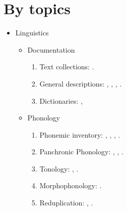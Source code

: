 \documentclass[oneside,a4paper,11pt]{article}
\newcommand{\langue}[2]{#1}
\begin{document}
\section{\langue{By topics}{Publications classées par domaine de recherche}}
\begin{itemize}
\item  \langue{Linguistics}{Linguistique} 
\begin{itemize}
\item  Documentation
\begin{enumerate}
\item  \langue{Text collections}{Collections de textes}: \citet{jacques10gesar}.
\item \langue{General descriptions}{Descriptions générales}: \citet{jacques04these}, \citet{jacques08}, \citet{jacques17sketch}, \citet{jacques17stau}.
\item \langue{Dictionaries}{Dictionnaires}: \citet{jacques15japhug}, \citet{jacques15khaling}
\end{enumerate}


\item \langue{Phonology}{Phonologie}
\begin{enumerate}
\item  \langue{Phonemic inventory}{Inventaire phonémique}: \citet{jacques04these},  \citet{jacques12khaling}, \citet{jacques14cone}, \citet{jacques17ipa}.
\item  \langue{Panchronic Phonology}{Phonologie panchronique}:  \citet{jacques11lingua}, \citet{michaud-jacques12nasalite},     \citet{jacques13arapaho}.
\item   \langue{Tonology}{Tonologie}: \citet{jacques11pumi.tone}, \citet{jacques16tonogenesis}.
\item \langue{Morphophonology}{Morphophonologie}: \citet{jacques12khaling}.
\item \langue{Reduplication}{Réduplication}:  \citet{jacques04redupl},  \citet{jacques07redupl}.
\end{enumerate}


\end{itemize}
\end{itemize}
\end{document}
